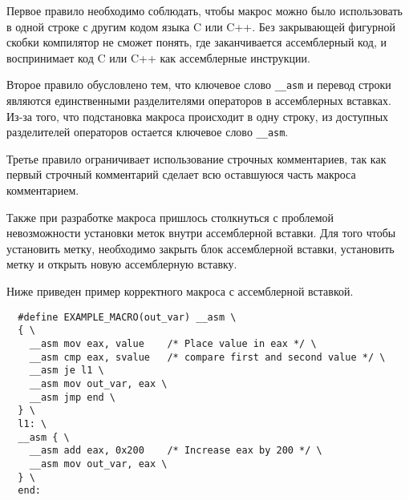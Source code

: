 Первое правило необходимо соблюдать, чтобы макрос можно было использовать в
одной строке с другим кодом языка C или C++. Без закрывающей фигурной скобки
компилятор не сможет понять, где заканчивается ассемблерный код, и воспринимает
код C или C++ как ассемблерные инструкции.

Второе правило обусловлено тем, что ключевое слово \verb!__asm! и перевод строки
являются единственными разделителями операторов в ассемблерных вставках. Из-за
того, что подстановка макроса происходит в одну строку, из доступных
разделителей операторов остается ключевое слово \verb!__asm!.

Третье правило ограничивает использование строчных комментариев, так как первый
строчный комментарий сделает всю оставшуюся часть макроса комментарием.

Также при разработке макроса пришлось столкнуться с проблемой невозможности
установки меток внутри ассемблерной вставки. Для того чтобы установить метку,
необходимо закрыть блок ассемблерной вставки, установить метку и открыть новую
ассемблерную вставку.

Ниже приведен пример корректного макроса с ассемблерной вставкой.
\begin{verbatim}
  #define EXAMPLE_MACRO(out_var) __asm \
  { \
    __asm mov eax, value    /* Place value in eax */ \
    __asm cmp eax, svalue   /* compare first and second value */ \
    __asm je l1 \
    __asm mov out_var, eax \ 
    __asm jmp end \
  } \
  l1: \
  __asm { \
    __asm add eax, 0x200    /* Increase eax by 200 */ \
    __asm mov out_var, eax \
  } \
  end:
\end{verbatim}
